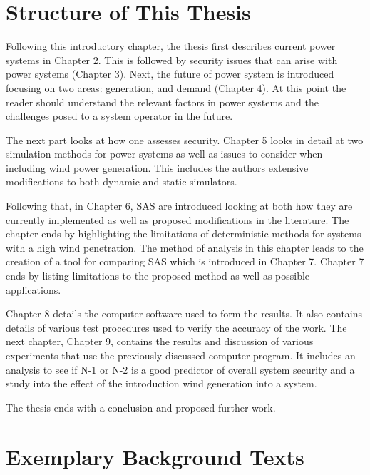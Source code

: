 \documentclass[a4paper,oneside,12pt]{report}
\begin{document}
\section{Structure of This Thesis}

Following this introductory chapter, the thesis first describes current power systems in Chapter 2. This is followed by security issues that can arise with power systems (Chapter 3). Next, the future of power system is introduced focusing on two areas: generation, and demand (Chapter 4). At this point the reader should understand the relevant factors in power systems and the challenges posed to a system operator in the future.

The next part looks at how one assesses security. Chapter 5 looks in detail at two simulation methods for power systems as well as issues to consider when including wind power generation. This includes the authors extensive modifications to both dynamic and static simulators.

Following that, in Chapter 6, SAS are introduced looking at both how they are currently implemented as well as proposed modifications in the literature. The chapter ends by highlighting the limitations of deterministic methods for systems with a high wind penetration. The method of analysis in this chapter leads to the creation of a tool for comparing SAS which is introduced in Chapter 7. Chapter 7 ends by listing limitations to the proposed method as well as possible applications. 

Chapter 8 details the computer software used to form the results. It also contains details of various test procedures used to verify the accuracy of the work.  The next chapter, Chapter 9, contains the results and discussion of various experiments that use the previously discussed computer program. It includes an analysis to see if N-1 or N-2 is a good predictor of overall system security and a study into the effect of the introduction wind generation into a system.

The thesis ends with a conclusion and proposed further work.

\pagebreak
\section{Exemplary Background Texts}
\end{document}
